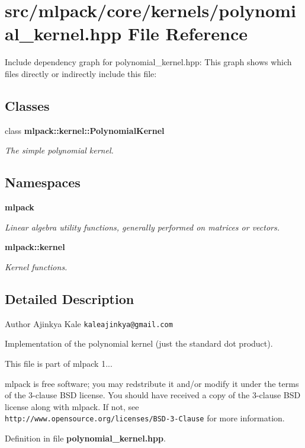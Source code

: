 \section{src/mlpack/core/kernels/polynomial\-\_\-kernel.hpp File Reference}
\label{polynomial__kernel_8hpp}
Include dependency graph for polynomial\-\_\-kernel.\-hpp\-:
This graph shows which files directly or indirectly include this file\-:
\subsection*{Classes}
\begin{DoxyCompactItemize}
\item 
class {\bf mlpack\-::kernel\-::\-Polynomial\-Kernel}
\begin{DoxyCompactList}\small\item\em The simple polynomial kernel. \end{DoxyCompactList}\end{DoxyCompactItemize}
\subsection*{Namespaces}
\begin{DoxyCompactItemize}
\item 
{\bf mlpack}
\begin{DoxyCompactList}\small\item\em Linear algebra utility functions, generally performed on matrices or vectors. \end{DoxyCompactList}\item 
{\bf mlpack\-::kernel}
\begin{DoxyCompactList}\small\item\em Kernel functions. \end{DoxyCompactList}\end{DoxyCompactItemize}


\subsection{Detailed Description}
\begin{DoxyAuthor}{Author}
Ajinkya Kale {\tt kaleajinkya@gmail.\-com}
\end{DoxyAuthor}
Implementation of the polynomial kernel (just the standard dot product).

This file is part of mlpack 1...

mlpack is free software; you may redstribute it and/or modify it under the terms of the 3-\/clause B\-S\-D license. You should have received a copy of the 3-\/clause B\-S\-D license along with mlpack. If not, see {\tt http\-://www.\-opensource.\-org/licenses/\-B\-S\-D-\/3-\/\-Clause} for more information. 

Definition in file {\bf polynomial\-\_\-kernel.\-hpp}.

